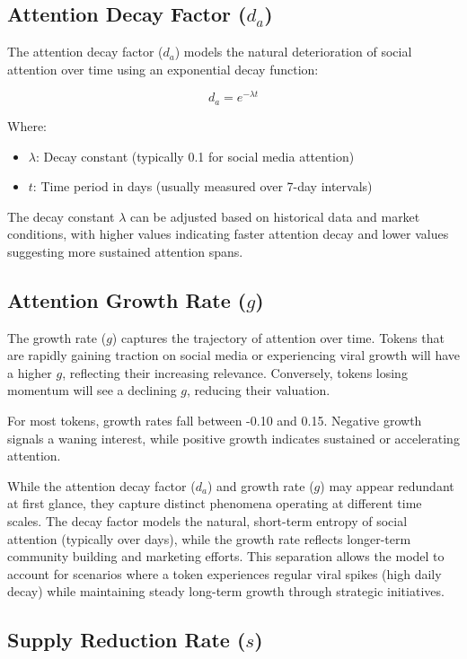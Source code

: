 \documentclass[a4paper,12pt]{article}
\begin{document}
\subsection*{Attention Decay Factor (\( d_a \))}

The attention decay factor (\( d_a \)) models the natural deterioration of social attention over time using an exponential decay function:

\[
d_a = e^{-\lambda t}
\]

Where:
\begin{itemize}
    \item \( \lambda \): Decay constant (typically 0.1 for social media attention)
    \item \( t \): Time period in days (usually measured over 7-day intervals)
\end{itemize}

The decay constant \( \lambda \) can be adjusted based on historical data and market conditions, with higher values indicating faster attention decay and lower values suggesting more sustained attention spans.

\subsection*{Attention Growth Rate (\( g \))}

The growth rate (\( g \)) captures the trajectory of attention over time. Tokens that are rapidly gaining traction on social media or experiencing viral growth will have a higher \( g \), reflecting their increasing relevance. Conversely, tokens losing momentum will see a declining \( g \), reducing their valuation.

For most tokens, growth rates fall between -0.10 and 0.15. Negative growth signals a waning interest, while positive growth indicates sustained or accelerating attention.

While the attention decay factor (\( d_a \)) and growth rate (\( g \)) may appear redundant at first glance, they capture distinct phenomena operating at different time scales. The decay factor models the natural, short-term entropy of social attention (typically over days), while the growth rate reflects longer-term community building and marketing efforts. This separation allows the model to account for scenarios where a token experiences regular viral spikes (high daily decay) while maintaining steady long-term growth through strategic initiatives.

\subsection*{Supply Reduction Rate (\( s \))}
\end{document}
